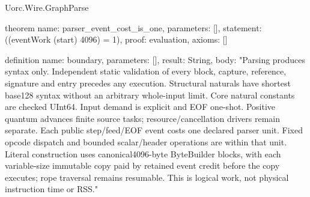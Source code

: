 \begin{lexlean}{Uorc.Wire.GraphParse}
\begin{semanticmodule}
theorem{
  name: parser_event_cost_is_one,
  parameters: [],
  statement: ((eventWork (start) 4096) = 1),
  proof: evaluation{},
  axioms: []
}

definition{
  name: boundary,
  parameters: [],
  result: String,
  body: "Parsing produces syntax only. Independent static validation of every block, capture, reference, signature and entry precedes any execution. Structural naturals have shortest base128 syntax without an arbitrary whole-input limit. Core natural constants are checked UInt64. Input demand is explicit and EOF one-shot. Positive quantum advances finite source tasks; resource/cancellation drivers remain separate. Each public step/feed/EOF event costs one declared parser unit. Fixed opcode dispatch and bounded scalar/header operations are within that unit. Literal construction uses canonical4096-byte ByteBuilder blocks, with each variable-size immutable copy paid by retained event credit before the copy executes; rope traversal remains resumable. This is logical work, not physical instruction time or RSS."
}
\end{semanticmodule}
\end{lexlean}
